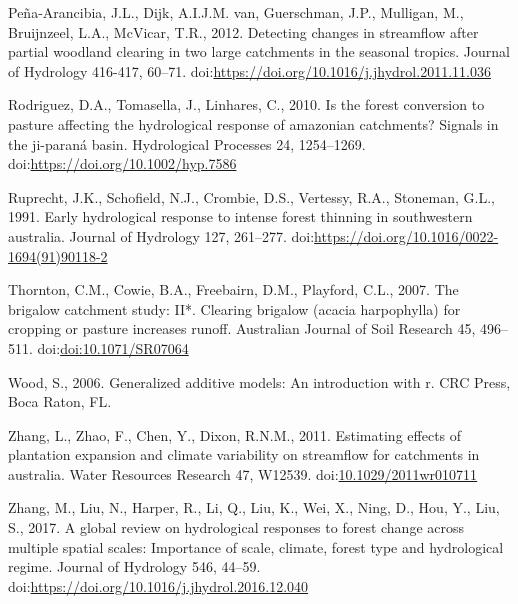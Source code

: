 \documentclass[]{elsarticle} %
\begin{document}
\leavevmode\hypertarget{ref-pena-arancibia2012}{}%
Peña-Arancibia, J.L., Dijk, A.I.J.M. van, Guerschman, J.P., Mulligan,
M., Bruijnzeel, L.A., McVicar, T.R., 2012. Detecting changes in
streamflow after partial woodland clearing in two large catchments in
the seasonal tropics. Journal of Hydrology 416-417, 60--71.
doi:\href{https://doi.org/https://doi.org/10.1016/j.jhydrol.2011.11.036}{https://doi.org/10.1016/j.jhydrol.2011.11.036}

\leavevmode\hypertarget{ref-rodriguez2010}{}%
Rodriguez, D.A., Tomasella, J., Linhares, C., 2010. Is the forest
conversion to pasture affecting the hydrological response of amazonian
catchments? Signals in the ji-paraná basin. Hydrological Processes 24,
1254--1269.
doi:\href{https://doi.org/https://doi.org/10.1002/hyp.7586}{https://doi.org/10.1002/hyp.7586}

\leavevmode\hypertarget{ref-ruprechtetal1991}{}%
Ruprecht, J.K., Schofield, N.J., Crombie, D.S., Vertessy, R.A.,
Stoneman, G.L., 1991. Early hydrological response to intense forest
thinning in southwestern australia. Journal of Hydrology 127, 261--277.
doi:\href{https://doi.org/https://doi.org/10.1016/0022-1694(91)90118-2}{https://doi.org/10.1016/0022-1694(91)90118-2}

\leavevmode\hypertarget{ref-thornton2007}{}%
Thornton, C.M., Cowie, B.A., Freebairn, D.M., Playford, C.L., 2007. The
brigalow catchment study: II*. Clearing brigalow (acacia harpophylla)
for cropping or pasture increases runoff. Australian Journal of Soil
Research 45, 496--511.
doi:\href{https://doi.org/doi:10.1071/SR07064}{doi:10.1071/SR07064}

\leavevmode\hypertarget{ref-wood2006}{}%
Wood, S., 2006. Generalized additive models: An introduction with r. CRC
Press, Boca Raton, FL.

\leavevmode\hypertarget{ref-zhang2011}{}%
Zhang, L., Zhao, F., Chen, Y., Dixon, R.N.M., 2011. Estimating effects
of plantation expansion and climate variability on streamflow for
catchments in australia. Water Resources Research 47, W12539.
doi:\href{https://doi.org/10.1029/2011wr010711}{10.1029/2011wr010711}

\leavevmode\hypertarget{ref-zhang2017}{}%
Zhang, M., Liu, N., Harper, R., Li, Q., Liu, K., Wei, X., Ning, D., Hou,
Y., Liu, S., 2017. A global review on hydrological responses to forest
change across multiple spatial scales: Importance of scale, climate,
forest type and hydrological regime. Journal of Hydrology 546, 44--59.
doi:\href{https://doi.org/https://doi.org/10.1016/j.jhydrol.2016.12.040}{https://doi.org/10.1016/j.jhydrol.2016.12.040}
\end{document}
